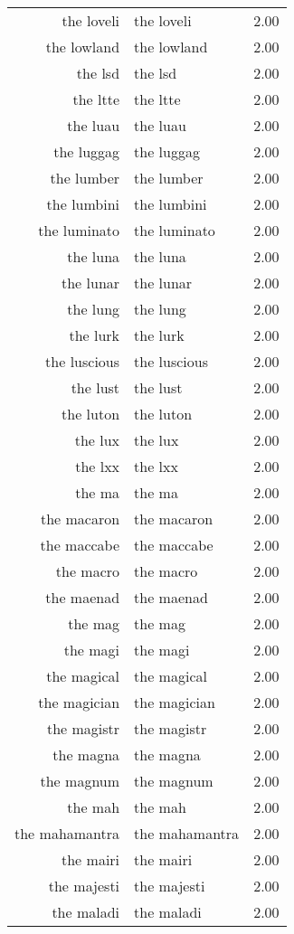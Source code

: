 \begin{table}[ht]
\begin{tabular}{rlr}
  the loveli & the loveli & 2.00 \\ 
  the lowland & the lowland & 2.00 \\ 
  the lsd & the lsd & 2.00 \\ 
  the ltte & the ltte & 2.00 \\ 
  the luau & the luau & 2.00 \\ 
  the luggag & the luggag & 2.00 \\ 
  the lumber & the lumber & 2.00 \\ 
  the lumbini & the lumbini & 2.00 \\ 
  the luminato & the luminato & 2.00 \\ 
  the luna & the luna & 2.00 \\ 
  the lunar & the lunar & 2.00 \\ 
  the lung & the lung & 2.00 \\ 
  the lurk & the lurk & 2.00 \\ 
  the luscious & the luscious & 2.00 \\ 
  the lust & the lust & 2.00 \\ 
  the luton & the luton & 2.00 \\ 
  the lux & the lux & 2.00 \\ 
  the lxx & the lxx & 2.00 \\ 
  the ma & the ma & 2.00 \\ 
  the macaron & the macaron & 2.00 \\ 
  the maccabe & the maccabe & 2.00 \\ 
  the macro & the macro & 2.00 \\ 
  the maenad & the maenad & 2.00 \\ 
  the mag & the mag & 2.00 \\ 
  the magi & the magi & 2.00 \\ 
  the magical & the magical & 2.00 \\ 
  the magician & the magician & 2.00 \\ 
  the magistr & the magistr & 2.00 \\ 
  the magna & the magna & 2.00 \\ 
  the magnum & the magnum & 2.00 \\ 
  the mah & the mah & 2.00 \\ 
  the mahamantra & the mahamantra & 2.00 \\ 
  the mairi & the mairi & 2.00 \\ 
  the majesti & the majesti & 2.00 \\ 
  the maladi & the maladi & 2.00 \\ 

\end{tabular}
\end{table}
